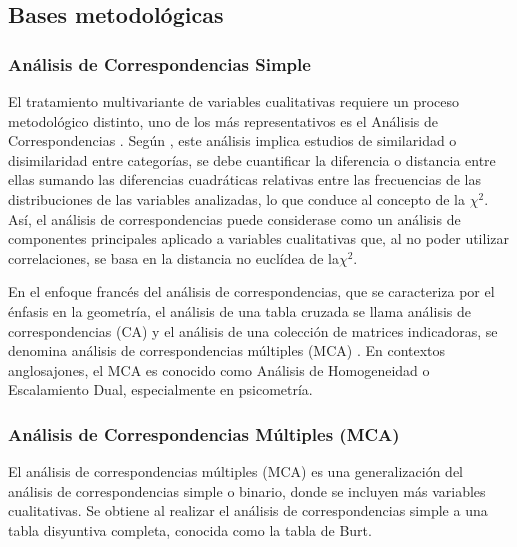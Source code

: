 \documentclass[water,article,submit,moreauthors,pdftex]{mdpi}
\begin{document}
\hypertarget{bases-metodoluxf3gicas}{%
\subsection{Bases metodológicas}\label{bases-metodoluxf3gicas}}

\hypertarget{anuxe1lisis-de-correspondencias-simple}{%
\subsubsection{Análisis de Correspondencias
Simple}\label{anuxe1lisis-de-correspondencias-simple}}

El tratamiento multivariante de variables cualitativas requiere un
proceso metodológico distinto, uno de los más representativos es el
Análisis de Correspondencias \citep{Benzecri}. Según \citep{perez2004},
este análisis implica estudios de similaridad o disimilaridad entre
categorías, se debe cuantificar la diferencia o distancia entre ellas
sumando las diferencias cuadráticas relativas entre las frecuencias de
las distribuciones de las variables analizadas, lo que conduce al
concepto de la \(\chi^2\). Así, el análisis de correspondencias puede
considerase como un análisis de componentes principales aplicado a
variables cualitativas que, al no poder utilizar correlaciones, se basa
en la distancia no euclídea de la\(\chi^2\).

En el enfoque francés del análisis de correspondencias, que se
caracteriza por el énfasis en la geometría, el análisis de una tabla
cruzada se llama análisis de correspondencias (CA) y el análisis de una
colección de matrices indicadoras, se denomina análisis de
correspondencias múltiples (MCA) \citep{michailidis1998}. En contextos
anglosajones, el MCA es conocido como Análisis de Homogeneidad o
Escalamiento Dual, especialmente en psicometría.

\hypertarget{anuxe1lisis-de-correspondencias-muxfaltiples-mca}{%
\subsubsection{Análisis de Correspondencias Múltiples
(MCA)}\label{anuxe1lisis-de-correspondencias-muxfaltiples-mca}}

El análisis de correspondencias múltiples (MCA) es una generalización
del análisis de correspondencias simple o binario, donde se incluyen más
variables cualitativas. Se obtiene al realizar el análisis de
correspondencias simple a una tabla disyuntiva completa, conocida como
la tabla de Burt.
\end{document}
